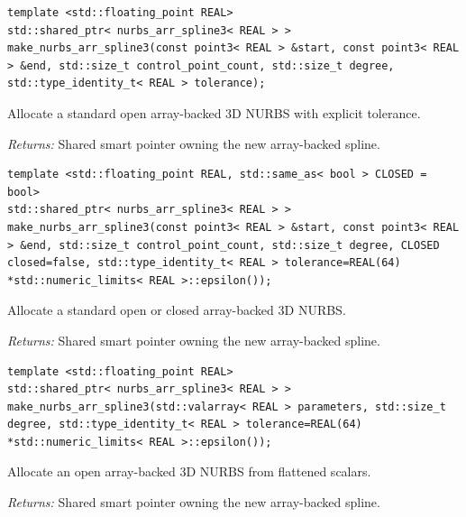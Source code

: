 \par\noindent\begin{minipage}{\linewidth}
\begin{lstlisting}[style=apireference]
template <std::floating_point REAL>
std::shared_ptr< nurbs_arr_spline3< REAL > > make_nurbs_arr_spline3(const point3< REAL > &start, const point3< REAL > &end, std::size_t control_point_count, std::size_t degree, std::type_identity_t< REAL > tolerance);
\end{lstlisting}
{\footnotesize Allocate a standard open array-backed 3D NURBS with explicit tolerance.\par}
{\footnotesize\textit{Returns:} Shared smart pointer owning the new array-backed spline.\par}
\end{minipage}\par\vspace{1pt}
\par\noindent\begin{minipage}{\linewidth}
\begin{lstlisting}[style=apireference]
template <std::floating_point REAL, std::same_as< bool > CLOSED = bool>
std::shared_ptr< nurbs_arr_spline3< REAL > > make_nurbs_arr_spline3(const point3< REAL > &start, const point3< REAL > &end, std::size_t control_point_count, std::size_t degree, CLOSED closed=false, std::type_identity_t< REAL > tolerance=REAL(64) *std::numeric_limits< REAL >::epsilon());
\end{lstlisting}
{\footnotesize Allocate a standard open or closed array-backed 3D NURBS.\par}
{\footnotesize\textit{Returns:} Shared smart pointer owning the new array-backed spline.\par}
\end{minipage}\par\vspace{1pt}
\par\noindent\begin{minipage}{\linewidth}
\begin{lstlisting}[style=apireference]
template <std::floating_point REAL>
std::shared_ptr< nurbs_arr_spline3< REAL > > make_nurbs_arr_spline3(std::valarray< REAL > parameters, std::size_t degree, std::type_identity_t< REAL > tolerance=REAL(64) *std::numeric_limits< REAL >::epsilon());
\end{lstlisting}
{\footnotesize Allocate an open array-backed 3D NURBS from flattened scalars.\par}
{\footnotesize\textit{Returns:} Shared smart pointer owning the new array-backed spline.\par}
\end{minipage}\par\vspace{1pt}
